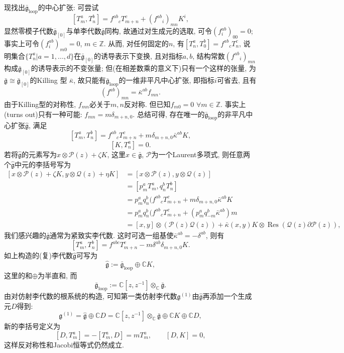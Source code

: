\documentclass{ctexart}%
\theoremstyle{definition}
\theoremstyle{remark}
\DeclareMathOperator{\Res}{Res}
\begin{document}
现找出$\bar{\mathfrak{g}}_{\text{loop}}$的中心扩张: 可尝试
$$[T^a_m, T^b_n]=f^{ab}{}_cT^c_{m+n}+(f^{ab}{}_i)_{mn}K^i,$$
显然零模子代数$\bar{\mathfrak{g}}_{[0]}$与单李代数$\bar{\mathfrak{g}}$同构, 故通过对生成元的选取, 可令$(f^{ab}_i)_{00}=0$; 事实上可令$(f^{ab}_i)_{m0}=0$, $m\in\mathbb{Z}$. 从而, 对任何固定的$n$, 有$[T^a_n,T^b_0]=f^{ab}{}_c T^c_n$, 说明集合$\{T^a_n|a=1,...,d\}$在$\bar{\mathfrak{g}}_{[0]}$的诱导表示下变换, 且对指标$a,b$, 结构常数$(f^{ab}{}_i)_{mn}$构成$\bar{\mathfrak{g}}_{[0]}$的诱导表示的不变张量; 但(在相差数乘的意义下)只有一个这样的张量, 为$\bar{\mathfrak{g}}\cong \bar{\mathfrak{g}}_{[0]}$的Killing 型 $\bar{\kappa}$, 故只能有$\bar{\mathfrak{g}}_{\text{loop}}$的一维非平凡中心扩张, 即指标$i$可省去, 且有
$$(f^{ab})_{mn} = \bar{\kappa}^{ab} f_{mn}.$$
由于Killing型的对称性, $f_{mn}$必关于$m,n$反对称. 但已知$f_{m0}=0$ $\forall m\in \mathbb{Z}$. 事实上(turns out)只有一种可能: $f_{mn}=m\delta_{m+n,0}$. 总结可得, 存在唯一的$\bar{\mathfrak{g}}_{\text{loop}}$的非平凡中心扩张$\hat{\mathfrak{g}}$, 满足
$$[T^a_m,T^b_n]=f^{ab}{}_c T^c_{m+n}+m\delta _{m+n,0} \bar{\kappa}^{ab} K,$$
$$[K,T^a_n]=0.$$
若将$\hat{\mathfrak{g}}$的元素写为$x\otimes \mathcal{P}(z)+\zeta K$, 这里$x\in \bar{\mathfrak{g}}$, $\mathcal{P}$为一个Laurent多项式, 则任意两个$\hat{\mathfrak{g}}$中元的李括号写为
\begin{equation}
\begin{aligned}
{}[x\otimes \mathcal{P}(z)+\zeta K,y\otimes \mathcal{Q}(z)+\eta K]
&=
[x\otimes \mathcal{P}(z),y\otimes \mathcal{Q}(z)]\\
&=[ p^a_m T^a_m,q^b_n T^b_n]\\
&= p^a_m q^b_n (f^{ab}{}_c T^c_{m+n} + m \delta_{m+n,0}\bar{\kappa}^{ab} K\\
&= p^a_m q^b_n (f^{ab}{}_c T^c_{m+n} + (p^a_m q^b_{-m}\bar{\kappa}^{ab})m\\
&=[x,y]\otimes(\mathcal{P}(z)\mathcal{Q}(z))+\bar{\kappa}(x,y)K\otimes \Res(\mathcal{Q}(z)\partial \mathcal{P}(z)),
\end{aligned}
\end{equation}
我们感兴趣的$\bar{\mathfrak{g}}$通常为紧致实李代数. 这时可选一组基使$\bar{\kappa}^{ab} = -\delta^{ab}$, 则有
$$[T^a_m,T^b_n]=f^{abc}T^c_{m+n}-m\delta^{ab}\delta_{m+n,0}K.$$
如上构造的(复)李代数$\hat{\mathfrak{g}}$可写为
$$\hat{\mathfrak{g}}:= \bar{\mathfrak{g}}_{\text{loop}}\oplus\mathbb{C}K,$$
这里的和$\oplus$为半直和, 而
$$\bar{\mathfrak{g}}_{\text{loop}}:=\mathbb{C}[z,z^{-1}]\otimes_{\mathbb{C}} \bar{\mathfrak{g}}.$$
由对仿射李代数的根系统的构造, 可知第一类仿射李代数$\mathfrak{g}^{(1)}$由$\hat{\mathfrak{g}}$再添加一个生成元$D$得到:
$$\mathfrak{g}^{(1)} = \hat{\mathfrak{g}}\oplus \mathbb{C} D = \mathbb{C}[z,z^{-1}]\otimes_{\mathbb{C}} \bar{\mathfrak{g}}\oplus \mathbb{C}K\oplus \mathbb{C} D,$$
新的李括号定义为
$$[D,T^a_m]=-[T^a_m,D]=m T^a_m,\qquad [D,K]=0,$$
这样反对称性和Jacobi恒等式仍然成立.
\end{document}
